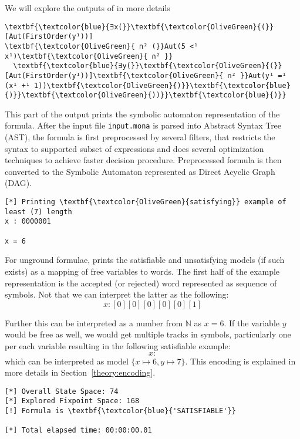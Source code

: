 We will explore the outputs of \gaston in more details

\begin{Verbatim}                               
\textbf{\textcolor{blue}{∃x(}}\textbf{\textcolor{OliveGreen}{(}}[Aut(FirstOrder(y¹))] 
\textbf{\textcolor{OliveGreen}{ ∩² (}}Aut(5 <¹ x¹)\textbf{\textcolor{OliveGreen}{ ∩² }}
  \textbf{\textcolor{blue}{∃y(}}\textbf{\textcolor{OliveGreen}{(}}[Aut(FirstOrder(y¹))]\textbf{\textcolor{OliveGreen}{ ∩² }}Aut(y¹ =¹ (x¹ +¹ 1))\textbf{\textcolor{OliveGreen}{)}}\textbf{\textcolor{blue}{)}}\textbf{\textcolor{OliveGreen}{))}}\textbf{\textcolor{blue}{)}}
\end{Verbatim}

This part of the output prints the symbolic automaton representation of the formula.
After the input file \texttt{input.mona} is parsed into Abstract Syntax Tree (AST),
the formula is first preprocessed by several filters, that restricts the syntax to
supported subset of expressions and does several optimization techniques to achieve
faster decision procedure. Preprocessed formula is then converted to the
Symbolic Automaton represented as Direct Acyclic Graph (DAG).

\begin{Verbatim}
[*] Printing \textbf{\textcolor{OliveGreen}{satisfying}} example of least (7) length
x : 0000001

x = 6
\end{Verbatim}

For unground formulae, \gaston prints the satisfiable and unsatisfying models 
(if such exists) as a mapping of free variables to words. The first half of the
example representation is the accepted (or rejected) word represented as sequence
of symbols. Not that we can interpret the latter as the following:
\begin{equation}
 x: [0][0][0][0][0][1]
\end{equation}

Further this can be interpreted as a number from $\mathbb{N}$ as $x = 6$. If the variable
$y$ would be free as well, we would get multiple tracks in symbols, particularly one per
each variable resulting in the following satisfiable example:
\begin{equation}
 x:
\end{equation}
which can be interpreted as model $\{x \mapsto 6, y \mapsto 7\}$. This encoding is explained
in more details in Section~\ref{theory:encoding}.

\begin{Verbatim}
[*] Overall State Space: 74
[*] Explored Fixpoint Space: 168
[!] Formula is \textbf{\textcolor{blue}{'SATISFIABLE'}}

[*] Total elapsed time: 00:00:00.01
\end{Verbatim}

